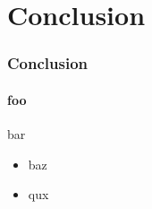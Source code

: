 \section{Conclusion}
\begin{frame}
  \frametitle{Conclusion}
  \framesubtitle{foo}
  bar
        \begin{itemize}
            \item baz
                \pause
              \item qux
        \end{itemize}
\end{frame}
